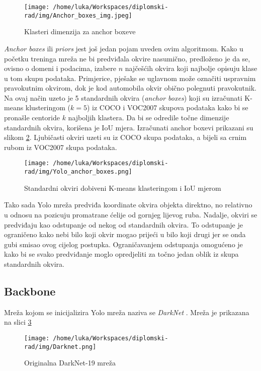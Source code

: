\begin{figure}[htp]
	\centering
	\texttt{[image: /home/luka/Workspaces/diplomski-rad/img/Anchor\_boxes\_img.jpeg]}
	\caption{Klasteri dimenzija za anchor boxeve}
	\label{img:anchor-boxes}
\end{figure}

\textit{Anchor boxes} ili \textit{priors} jest još jedan pojam uveden ovim algoritmom. Kako u početku treninga mreža ne bi predviđala okvire nasumično, predloženo je da se, ovisno o domeni i podacima, izabere $n$ najčešćih okvira koji najbolje opisuju klase u tom skupu podataka. Primjerice, pješake se uglavnom može označiti uspravnim pravokutnim okvirom, dok je kod automobila okvir obično polegnuti pravokutnik. Na ovaj način uzeto je 5 standardnih okvira (\textit{anchor boxes}) koji su izračunati K-means klusteringom ($k=5$) iz COCO i VOC2007 skupova podataka kako bi se pronašle centoride $k$ najboljih klastera. Da bi se odredile točne dimenzije standardnih okvira, korišena je IoU mjera. Izračunati anchor boxevi prikazani su slikom \ref{img:yolo-anchors}. Ljubičasti okviri uzeti su iz COCO skupa podataka, a bijeli sa crnim rubom iz VOC2007 skupa podataka.

\begin{figure}[htp]
	\centering
	\texttt{[image: /home/luka/Workspaces/diplomski-rad/img/Yolo\_anchor\_boxes.png]}
	\caption{Standardni okviri dobiveni K-means klasteringom i IoU mjerom \citep{YOLO}}
	\label{img:yolo-anchors}
\end{figure}

Tako sada Yolo mreža predviđa koordinate okvira objekta direktno, no relativno u odnosu na pozicuju promatrane ćelije od gornjeg lijevog ruba. Nadalje, okviri se predviđaju kao odstupanje od nekog od standardnih okvira. To odstupanje je ograničeno kako nebi bilo koji okvir mogao prijeći u bilo koji drugi jer se onda gubi smisao ovog cijelog postupka. Ograničavanjem odstupanja omogućeno je kako bi se svako predviđanje moglo opredjeliti za točno jedan oblik iz skupa standardnih okvira.

\subsection{Backbone}

Mreža kojom se inicijalizira Yolo mreža naziva se \textit{DarkNet} \citep{Darknet}. Mreža je prikazana na slici \ref{img:darknet}

\begin{figure}[htp]
	\centering
	\texttt{[image: /home/luka/Workspaces/diplomski-rad/img/Darknet.png]}
	\caption{Originalna DarkNet-19 mreža \citep{YOLO}}
	\label{img:darknet}
\end{figure}

